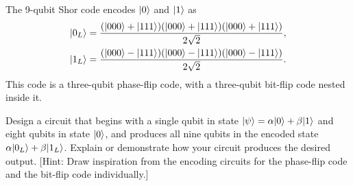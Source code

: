 \documentclass{../phys084}
\begin{document}
\begin{exercise}
  The 9-qubit Shor code encodes \(\lvert0\rangle\) and \(\lvert1\rangle\) as
  \begin{align*}
    \lvert0_L\rangle &= \frac
    {(\lvert000\rangle+\lvert111\rangle)(\lvert000\rangle+\lvert111\rangle)(\lvert000\rangle+\lvert111\rangle)}
    {2 \sqrt 2}, \\
    \lvert1_L\rangle &= \frac
    {(\lvert000\rangle-\lvert111\rangle)(\lvert000\rangle-\lvert111\rangle)(\lvert000\rangle-\lvert111\rangle)}
    {2\sqrt 2}.
  \end{align*}
  This code is a three-qubit phase-flip code, with a three-qubit
  bit-flip code nested inside it.

  Design a circuit that begins with a single qubit in state
  \(\lvert\psi\rangle = \alpha\lvert0\rangle + \beta\lvert1\rangle\) and eight qubits in state
  \(\lvert0\rangle\), and produces all nine qubits in the encoded state
  \(\alpha\lvert0_L\rangle + \beta\lvert1_L\rangle\).  Explain or demonstrate how
  your circuit produces the desired output.  [Hint: Draw inspiration
  from the encoding circuits for the phase-flip code and the bit-flip
  code individually.]
\end{exercise}

\begin{solution}

\end{solution}
\end{document}
